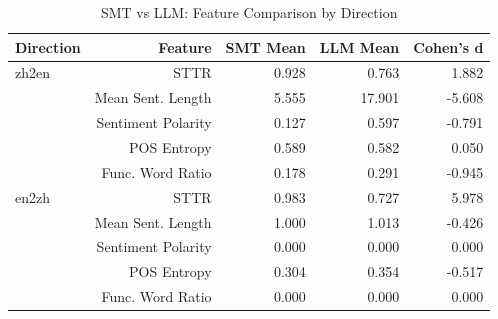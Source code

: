 \begin{table}[h]
\centering
\caption{SMT vs LLM: Feature Comparison by Direction}
\begin{tabular}{lrrrr}
\toprule
Direction & Feature & SMT Mean & LLM Mean & Cohen's d \\
\midrule
  zh2en & STTR & 0.928 & 0.763 & 1.882 \\
   & Mean Sent. Length & 5.555 & 17.901 & -5.608 \\
   & Sentiment Polarity & 0.127 & 0.597 & -0.791 \\
   & POS Entropy & 0.589 & 0.582 & 0.050 \\
   & Func. Word Ratio & 0.178 & 0.291 & -0.945 \\
  en2zh & STTR & 0.983 & 0.727 & 5.978 \\
   & Mean Sent. Length & 1.000 & 1.013 & -0.426 \\
   & Sentiment Polarity & 0.000 & 0.000 & 0.000 \\
   & POS Entropy & 0.304 & 0.354 & -0.517 \\
   & Func. Word Ratio & 0.000 & 0.000 & 0.000 \\
\bottomrule
\end{tabular}
\end{table}